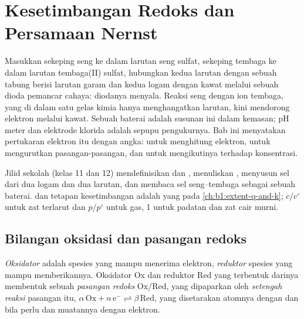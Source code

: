 \chapter{Kesetimbangan Redoks dan Persamaan Nernst}\label{ch:b1:nernst}

Masukkan sekeping seng ke dalam larutan seng sulfat, sekeping tembaga ke
dalam larutan tembaga(II) sulfat, hubungkan kedua larutan dengan sebuah
tabung berisi larutan garam dan kedua logam dengan kawat melalui sebuah
dioda pemancar cahaya: diodanya menyala. Reaksi seng dengan ion tembaga,
yang di dalam satu gelas kimia hanya menghangatkan larutan, kini
mendorong elektron melalui kawat. Sebuah baterai adalah susunan ini dalam
kemasan; pH meter dan elektrode klorida adalah sepupu pengukurnya. Bab
ini menyatakan pertukaran elektron itu dengan angka: 
untuk menghitung elektron,  untuk mengurutkan
pasangan-pasangan, dan  untuk mengikutinya terhadap
konsentrasi.

\begin{recall}
Jilid sekolah (kelas 11 dan 12) mendefinisikan  dan ,
menuliskan , menyusun sel dari dua logam dan dua larutan,
dan membaca sel seng--tembaga sebagai sebuah baterai.  dan
tetapan kesetimbangan adalah yang pada \cref{ch:b1:extent-q-and-k};
 $c/c^\circ$ untuk zat terlarut dan $p/p^\circ$ untuk gas,
1 untuk padatan dan zat cair murni.
\end{recall}

\section{Bilangan oksidasi dan pasangan redoks}

\begin{definition}\label{def:b1:nernst:couple}
\emph{Oksidator} adalah spesies yang mampu menerima
elektron, \emph{reduktor} spesies yang mampu
memberikannya. Oksidator Ox dan reduktor Red yang terbentuk darinya
membentuk sebuah \emph{pasangan redoks} Ox/Red,
yang dipaparkan oleh \emph{setengah reaksi} pasangan itu,
$\alpha\,\mathrm{Ox} + n\,\mathrm{e^-} \rightleftharpoons
\beta\,\mathrm{Red}$, yang disetarakan atomnya dengan  dan
 bila perlu dan muatannya dengan elektron.
\end{definition}

